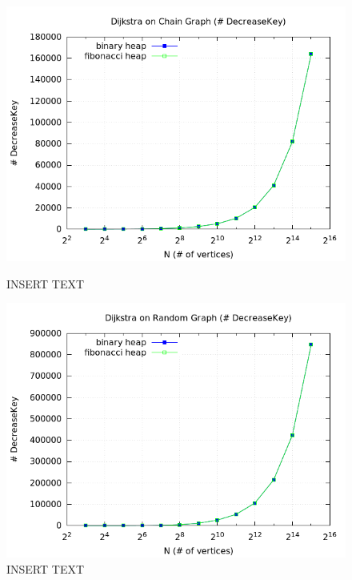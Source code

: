 \documentclass[a4paper,oneside,article,11pt]{memoir}
\begin{document}
\begin{figure}[H]
\centering
\begin{minipage}{0.48\columnwidth}
  \centering
  \includegraphics[width=\linewidth]{../res/dijkstra/d_chain_dk.png}%
  \caption{INSERT TEXT}
  \label{fig:delmin_2_random_branch}
\end{minipage}%
\hfill
\begin{minipage}{0.48\columnwidth}
  \centering
  \includegraphics[width=\linewidth]{../res/dijkstra/d_random_dk.png}%
  \caption{INSERT TEXT}
  \label{fig:delmin_2_worst_branch}
\end{minipage}
\end{figure}
\end{document}
